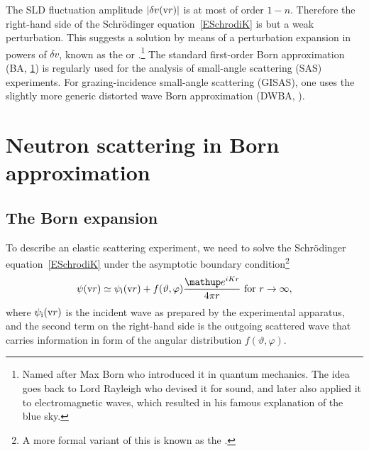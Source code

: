 The SLD fluctuation amplitude $|\delta v(\text{v}{r})|$ is at most of order $1-n$.
Therefore the right-hand side of the Schrödinger equation~\cref{ESchrodiK}
is but a weak perturbation.
This suggests a solution
by means of a perturbation expansion in powers of $\delta v$,
%
known as the  or .\footnote{
Named after Max Born
who introduced it in quantum mechanics.
The idea goes back to Lord Rayleigh
who devised it for sound,
and later also applied it to electromagnetic waves,
which resulted in his famous explanation of the blue sky.}
The standard first-order Born approximation (BA, \cref{SBornApprox})
is regularly used  for the analysis of small-angle scattering (SAS) experiments.
%
%
%
For grazing-incidence small-angle scattering (GISAS),
one uses the slightly more generic distorted wave Born approximation (DWBA, ).
%

%
%

\section{Neutron scattering in Born approximation}\label{SBornApprox}

\subsection{The Born expansion}\label{SBornExpans}

%
%

To describe an elastic scattering experiment,
we need to solve the Schrödinger equation~\cref{ESchrodiK}
under the asymptotic boundary condition\footnote
{A more formal variant of this is known as the .%
}
%
\begin{equation}\label{Escabouco}
  \psi(\r)
  \simeq \psi_\si(\r) + f(\vartheta,\varphi)\frac{\e^{iKr}}{4\pi r}
  \text{~for~}r\to\infty,
\end{equation}
%
%
%
where $\psi_{\text{i}}(\text{v}{r})$ is the incident wave
as prepared by the experimental apparatus,
and the second term on the right-hand side is
the outgoing scattered wave
that carries information in form of the angular distribution
$f(\vartheta,\varphi)$.

